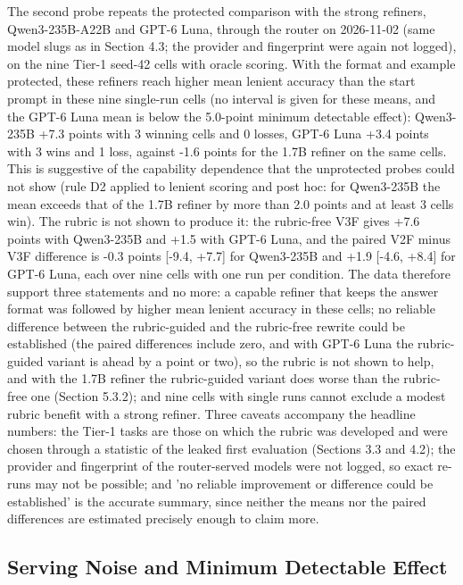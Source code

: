 \documentclass{ieeeaccess}
\begin{document}
The second probe repeats the protected comparison with the strong refiners, Qwen3-235B-A22B and GPT-6 Luna, through the router on 2026-11-02 (same model slugs as in Section 4.3; the provider and fingerprint were again not logged), on the nine Tier-1 seed-42 cells with oracle scoring. With the format and example protected, these refiners reach higher mean lenient accuracy than the start prompt in these nine single-run cells (no interval is given for these means, and the GPT-6 Luna mean is below the 5.0-point minimum detectable effect): Qwen3-235B +7.3 points with 3 winning cells and 0 losses, GPT-6 Luna +3.4 points with 3 wins and 1 loss, against -1.6 points for the 1.7B refiner on the same cells. This is suggestive of the capability dependence that the unprotected probes could not show (rule D2 applied to lenient scoring and post hoc: for Qwen3-235B the mean exceeds that of the 1.7B refiner by more than 2.0 points and at least 3 cells win). The rubric is not shown to produce it: the rubric-free V3F gives +7.6 points with Qwen3-235B and +1.5 with GPT-6 Luna, and the paired V2F minus V3F difference is -0.3 points [-9.4, +7.7] for Qwen3-235B and +1.9 [-4.6, +8.4] for GPT-6 Luna, each over nine cells with one run per condition. The data therefore support three statements and no more: a capable refiner that keeps the answer format was followed by higher mean lenient accuracy in these cells; no reliable difference between the rubric-guided and the rubric-free rewrite could be established (the paired differences include zero, and with GPT-6 Luna the rubric-guided variant is ahead by a point or two), so the rubric is not shown to help, and with the 1.7B refiner the rubric-guided variant does worse than the rubric-free one (Section 5.3.2); and nine cells with single runs cannot exclude a modest rubric benefit with a strong refiner. Three caveats accompany the headline numbers: the Tier-1 tasks are those on which the rubric was developed and were chosen through a statistic of the leaked first evaluation (Sections 3.3 and 4.2); the provider and fingerprint of the router-served models were not logged, so exact re-runs may not be possible; and 'no reliable improvement or difference could be established' is the accurate summary, since neither the means nor the paired differences are estimated precisely enough to claim more.

\subsection{Serving Noise and Minimum Detectable Effect}
\end{document}
